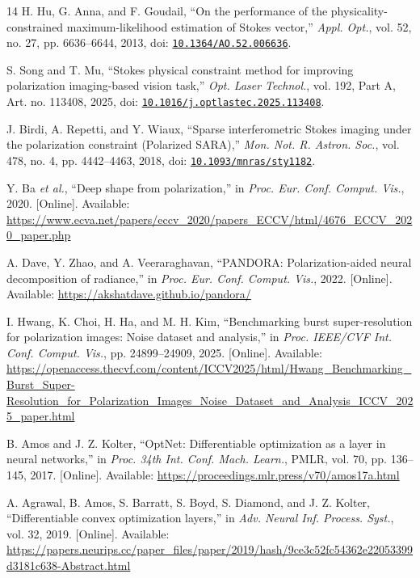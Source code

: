 \begin{thebibliography}{14}
 H. Hu, G. Anna, and F. Goudail, ``On the performance of the physicality-constrained maximum-likelihood estimation of Stokes vector,'' \emph{Appl. Opt.}, vol. 52, no. 27, pp. 6636--6644, 2013, doi: \href{https://doi.org/10.1364/AO.52.006636}{\nolinkurl{10.1364/AO.52.006636}}.

 S. Song and T. Mu, ``Stokes physical constraint method for improving polarization imaging-based vision task,'' \emph{Opt. Laser Technol.}, vol. 192, Part A, Art. no. 113408, 2025, doi: \href{https://doi.org/10.1016/j.optlastec.2025.113408}{\nolinkurl{10.1016/j.optlastec.2025.113408}}.

 J. Birdi, A. Repetti, and Y. Wiaux, ``Sparse interferometric Stokes imaging under the polarization constraint (Polarized SARA),'' \emph{Mon. Not. R. Astron. Soc.}, vol. 478, no. 4, pp. 4442--4463, 2018, doi: \href{https://doi.org/10.1093/mnras/sty1182}{\nolinkurl{10.1093/mnras/sty1182}}.

 Y. Ba \emph{et al.}, ``Deep shape from polarization,'' in \emph{Proc. Eur. Conf. Comput. Vis.}, 2020. [Online]. Available: \url{https://www.ecva.net/papers/eccv_2020/papers_ECCV/html/4676_ECCV_2020_paper.php}

 A. Dave, Y. Zhao, and A. Veeraraghavan, ``PANDORA: Polarization-aided neural decomposition of radiance,'' in \emph{Proc. Eur. Conf. Comput. Vis.}, 2022. [Online]. Available: \url{https://akshatdave.github.io/pandora/}

 I. Hwang, K. Choi, H. Ha, and M. H. Kim, ``Benchmarking burst super-resolution for polarization images: Noise dataset and analysis,'' in \emph{Proc. IEEE/CVF Int. Conf. Comput. Vis.}, pp. 24899--24909, 2025. [Online]. Available: \url{https://openaccess.thecvf.com/content/ICCV2025/html/Hwang_Benchmarking_Burst_Super-Resolution_for_Polarization_Images_Noise_Dataset_and_Analysis_ICCV_2025_paper.html}

 B. Amos and J. Z. Kolter, ``OptNet: Differentiable optimization as a layer in neural networks,'' in \emph{Proc. 34th Int. Conf. Mach. Learn.}, PMLR, vol. 70, pp. 136--145, 2017. [Online]. Available: \url{https://proceedings.mlr.press/v70/amos17a.html}

 A. Agrawal, B. Amos, S. Barratt, S. Boyd, S. Diamond, and J. Z. Kolter, ``Differentiable convex optimization layers,'' in \emph{Adv. Neural Inf. Process. Syst.}, vol. 32, 2019. [Online]. Available: \url{https://papers.neurips.cc/paper_files/paper/2019/hash/9ce3c52fc54362e22053399d3181c638-Abstract.html}


\end{thebibliography}

